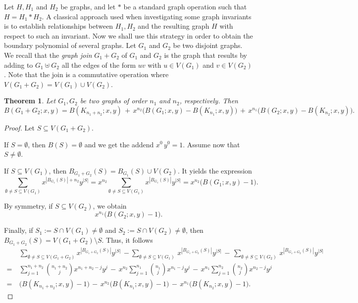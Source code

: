 \documentclass[review]{elsarticle}
\newtheorem{theorem}{Theorem}[section]
\begin{document}
Let $H, H_1$ and $H_2$ be graphs, and let $*$ be a standard graph operation such that $H=H_1*H_2$.  A classical approach used when investigating some graph invariants is to establish relationships between $H_1,H_2$ and the resulting graph $H$ with respect to such an invariant. Now we shall use this strategy in order to obtain the boundary polynomial of several graphs. 
Let $G_1$ and $G_2$ be two disjoint graphs. We recall that the \emph{graph join} $G_1 + G_2$ of $G_1$ and $G_2$ is the graph that results by  adding to $G_1\uplus G_2$ all the edges of the form $uv$ with $u\in V(G_1)$ and $v\in V(G_2)$.
Note that the join is a commutative operation where $V(G_1+G_2)=V(G_1)\cup V(G_2)$.

\begin{theorem}\label{t:join}
  Let $G_1,G_2$ be two graphs of order $n_1$ and $n_2$, respectively. Then
  \[
  B(G_{1}+G_{2};x,y) = B(K_{n_1+n_2};x,y) \,+\, x^{n_{2}} \big(B(G_{1};x,y)-B(K_{n_1};x,y)\big) \,+\, x^{n_{1}} \big(B(G_{2};x,y)-B(K_{n_2};x,y)\big).
  \]
\end{theorem}  

\begin{proof}
 Let $S \subseteq V(G_{1}+G_{2})$. 
 
 If $S=\emptyset$, then $B(S)=\emptyset$ and we get the addend $x^0\,y^0=1$. Assume now that $S\neq\emptyset$.

 If $S\subseteq V(G_1)$, then $B_{G_1+G_2}(S)=B_{G_1}(S)\cup V(G_2)$. It yields the expression 
 \[
  \sum_{\emptyset \not= S \subseteq V(G_{1})} x^{|B_{G_{1}}(S)|+n_2}y^{|S|} = x^{n_{2}}\sum_{\emptyset \not= S\subseteq V(G_{1})} x^{|B_{G_{1}}(S)|}y^{|S|} = x^{n_{2}}\big(B(G_{1};x,y)-1\big).
 \]

By symmetry, if $S\subseteq V(G_2)$, we obtain 
 \[ 
   x^{n_{1}}\big(B(G_{2};x,y)-1\big).
 \]                                                
 

Finally, if $S_1:=S\cap V(G_1)\neq\emptyset$ and $S_2:=S\cap V(G_2)\neq\emptyset$, then $B_{G_1+G_2}(S)=V(G_1+G_2)\setminus S$. Thus, it follows  
 \begin{align*}
  \quad & \sum_{\emptyset \not= S \subseteq V(G_{1}+G_{2})} x^{|B_{G_{1}+G_{2}}(S)|}y^{|S|}\,-\sum_{\emptyset\neq S\subseteq V(G_1)}\, x^{|B_{G_{1}+G_{2}}(S)|}y^{|S|}\,-\, \sum_{\emptyset\neq S\subseteq V(G_2)}\,x^{|B_{G_{1}+G_{2}}(S)|}y^{|S|} \\
  = & \sum_{j=1}^{n_1+n_2}\binom{n_1+n_2}{j} x^{n_1+n_2-j} y^{j} \,-\, x^{n_2} \sum_{j=1}^{n_1} \binom{n_1}{j} x^{n_1-j} y^{j}  \,-\, x^{n_1} \sum_{j=1}^{n_2} \binom{n_2}{j} x^{n_2-j} y^{j} \\
  = & \big(B(K_{n_1+n_2};x,y)-1\big) \,-\, x^{n_{2}} \big(B(K_{n_1};x,y)-1\big) \,-\, x^{n_{1}} \big(B(K_{n_2};x,y)-1\big).
\end{align*}
\end{proof}
\end{document}
